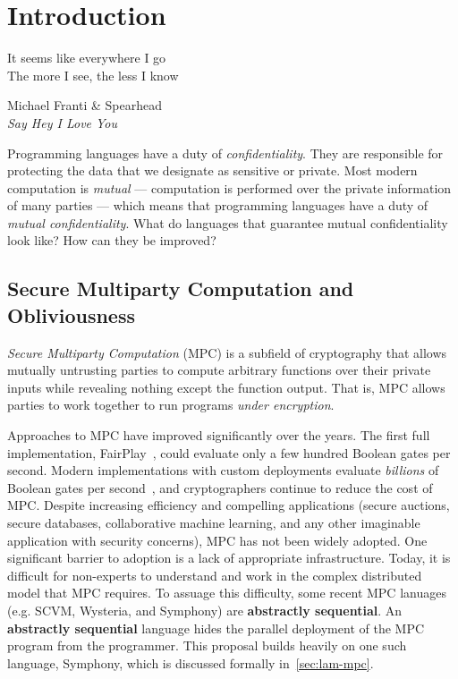 \chapter{Introduction}
\label{ch:intro}

\epigraph{It seems like everywhere I go \\
          The more I see, the less I know}{
            Michael Franti \& Spearhead \\
            \emph{Say Hey I Love You}}

Programming languages have a duty of \emph{confidentiality}. They are responsible for protecting the
data that we designate as sensitive or private. Most modern computation is \emph{mutual} --- computation
is performed over the private information of many parties --- which means that programming languages
have a duty of \emph{mutual confidentiality}. What do languages that guarantee mutual confidentiality look
like? How can they be improved?

\section{Secure Multiparty Computation and Obliviousness}
\label{sec:intro}

\emph{Secure Multiparty Computation} (MPC) is a subfield of cryptography
that allows mutually untrusting parties to compute arbitrary functions over their private inputs while revealing nothing
except the function output. That is, MPC allows parties to work together to run programs \emph{under encryption}.

Approaches to MPC have improved significantly over the years. The first full implementation, FairPlay~\cite{todo}, could evaluate
only a few hundred Boolean gates per second. Modern implementations with custom deployments evaluate \emph{billions} of Boolean gates per
second~\cite{todo}, and cryptographers continue to reduce the cost of MPC. Despite increasing efficiency and compelling applications
(secure auctions, secure databases, collaborative machine learning, and any other imaginable application with security concerns),
MPC has not been widely adopted. One significant barrier to adoption is a lack of appropriate infrastructure. Today, it is difficult
for non-experts to understand and work in the complex distributed model that MPC requires. To assuage this difficulty, some recent
MPC lanuages (e.g. SCVM, Wysteria, and Symphony) are \textbf{abstractly sequential}. An \textbf{abstractly sequential} language hides
the parallel deployment of the MPC program from the programmer. This proposal builds heavily on one such language, Symphony, which is
discussed formally in~\cref{sec:lam-mpc}.

